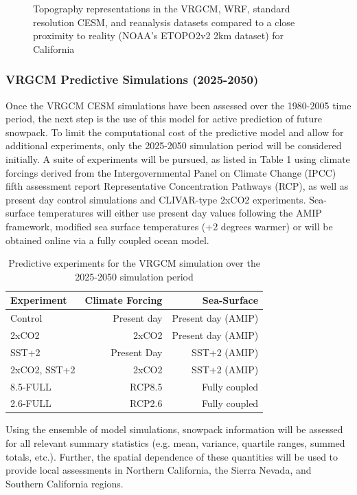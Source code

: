 \documentclass[11pt]{article}
\begin{document}
\begin{figure}
\begin{center}
  \caption{\label{f3}  Topography representations in the VRGCM, WRF, standard resolution CESM, and reanalysis datasets compared to a close proximity to reality (NOAA's ETOPO2v2 2km dataset) for California}
  \end{center}
\end{figure}

\subsubsection{VRGCM Predictive Simulations (2025-2050)}
Once the VRGCM CESM simulations have been assessed over the 1980-2005 time period, the next step is the use of this model for active prediction of future snowpack. To limit the computational cost of the predictive model and allow for additional experiments, only the 2025-2050 simulation period will be considered initially. A suite of experiments will be pursued, as listed in Table 1 using climate forcings derived from the Intergovernmental Panel on Climate Change (IPCC) fifth assessment report Representative Concentration Pathways (RCP), as well as present day control simulations and CLIVAR-type 2xCO2 experiments. Sea-surface temperatures will either use present day values following the AMIP framework, modified sea surface temperatures (+2 degrees warmer) or will be obtained online via a fully coupled ocean model.

\begin{table}[t1]
\begin{center}
\caption{Predictive experiments for the VRGCM simulation over the 2025-2050 simulation period}
\vspace{0.3cm}
\begin{tabular}{|l|r|r|} \hline
Experiment & Climate Forcing & Sea-Surface \\\hline
Control & Present day & Present day (AMIP) \\
2xCO2 & 2xCO2 & Present day (AMIP) \\
SST+2 & Present Day & SST+2 (AMIP) \\
2xCO2, SST+2 & 2xCO2 & SST+2 (AMIP) \\
8.5-FULL & RCP8.5 & Fully coupled \\
2.6-FULL & RCP2.6 & Fully coupled \\\hline
\end{tabular}
\end{center}
\end{table}

Using the ensemble of model simulations, snowpack information will be assessed for all relevant summary statistics (e.g. mean, variance, quartile ranges, summed totals, etc.). Further, the spatial dependence of these quantities will be used to provide local assessments in Northern California, the Sierra Nevada, and Southern California regions.
\end{document}
